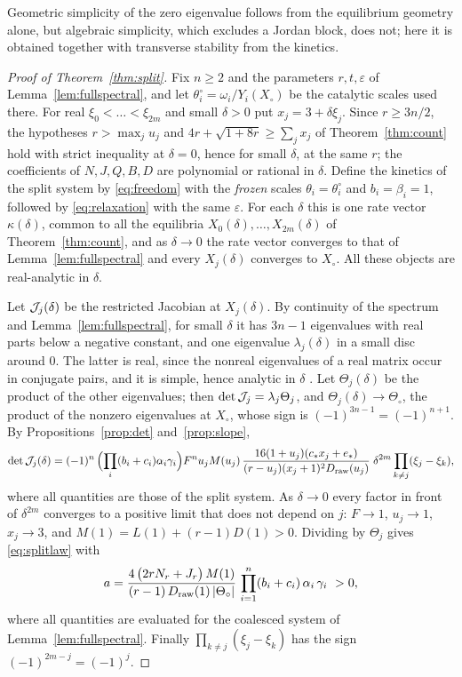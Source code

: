 Geometric simplicity of the zero eigenvalue follows from the equilibrium geometry alone, but
algebraic simplicity, which excludes a Jordan block, does not; here it is obtained together
with transverse stability from the kinetics.

\begin{proof}[Proof of Theorem~\ref{thm:split}]
Fix \(n\ge2\) and the parameters \(r,t,\varepsilon\) of Lemma~\ref{lem:fullspectral}, and let
\(\theta_i^\circ=\omega_i/Y_i(X_\circ)\) be the catalytic scales used there. For real
\(\xi_0<\dots<\xi_{2m}\) and small \(\delta>0\) put \(x_j=3+\delta\xi_j\). Since \(r\ge3n/2\), the
hypotheses \(r>\max_ju_j\) and \(4r+\sqrt{1+8r}\ge\sum_jx_j\) of Theorem~\ref{thm:count} hold
with strict inequality at \(\delta=0\), hence for small \(\delta\), at the same \(r\); the
coefficients of \(N,J,Q,B,D\) are polynomial or rational in \(\delta\). Define the kinetics of the split system by
\eqref{eq:freedom} with the \emph{frozen} scales \(\theta_i=\theta_i^\circ\) and
\(b_i=\beta_i=1\), followed by \eqref{eq:relaxation} with the same \(\varepsilon\). For each
\(\delta\) this is one rate vector \(\kappa(\delta)\), common to all the equilibria
\(X_0(\delta),\dots,X_{2m}(\delta)\) of Theorem~\ref{thm:count}, and as \(\delta\to0\) the rate
vector converges to that of Lemma~\ref{lem:fullspectral} and every \(X_j(\delta)\) converges
to \(X_\circ\). All these objects are real-analytic in \(\delta\).

Let \(\mathcal J_j(\delta)\) be the restricted Jacobian at \(X_j(\delta)\). By continuity of the
spectrum and Lemma~\ref{lem:fullspectral}, for small \(\delta\) it has \(3n-1\) eigenvalues
with real parts below a negative constant, and one eigenvalue \(\lambda_j(\delta)\) in a small
disc around \(0\). The latter is real, since the nonreal eigenvalues of a real matrix occur in
conjugate pairs, and it is simple, hence analytic in \(\delta\) \cite[Ch.~II]{Kato}. Let
\(\Theta_j(\delta)\) be the product of the other eigenvalues; then
\(\det\mathcal J_j=\lambda_j\Theta_j\), and \(\Theta_j(\delta)\to\Theta_\circ\), the product of the
nonzero eigenvalues at \(X_\circ\), whose sign is \((-1)^{3n-1}=(-1)^{n+1}\). By
Propositions~\ref{prop:det} and~\ref{prop:slope},
\[
 \det\mathcal J_j(\delta)=(-1)^{n}\,\Bigl(\prod_i(b_i+c_i)\alpha_i\gamma_i\Bigr)F^{n}u_jM(u_j)\,
 \frac{16(1+u_j)(c_\ast x_j+e_\ast)}{(r-u_j)(x_j+1)^2D_{\mathrm{raw}}(u_j)}\;\delta^{2m}\prod_{k\ne j}(\xi_j-\xi_k),
\]
where all quantities are those of the split system. As \(\delta\to0\) every factor in front of
\(\delta^{2m}\) converges to a positive limit that does not depend on \(j\): \(F\to1\),
\(u_j\to1\), \(x_j\to3\), and \(M(1)=L(1)+(r-1)D(1)>0\). Dividing by \(\Theta_j\) gives
\eqref{eq:splitlaw} with
\begin{equation}\label{eq:aconst}
 a=\frac{4\,\bigl(2rN_r+J_r\bigr)\,M(1)}{(r-1)\,D_{\mathrm{raw}}(1)\,|\Theta_\circ|}\,
 \prod_{i=1}^n(b_i+c_i)\,\alpha_i\,\gamma_i\ >0,
\end{equation}
where all quantities are evaluated for the coalesced system of Lemma~\ref{lem:fullspectral}.
Finally \(\prod_{k\ne j}(\xi_j-\xi_k)\) has the sign \((-1)^{2m-j}=(-1)^{j}\).
\end{proof}

